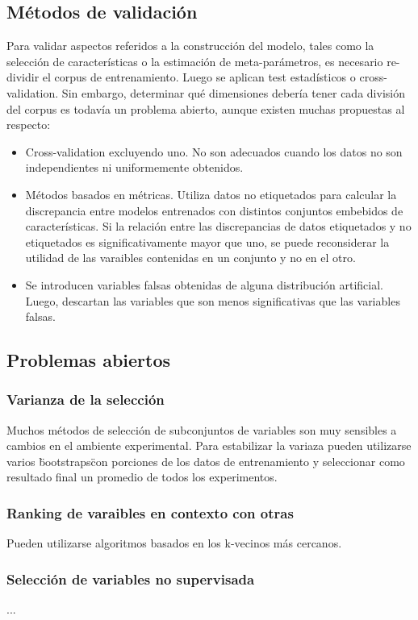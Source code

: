 \documentclass[11pt,spanish]{article}
\begin{document}
\subsection{Métodos de validación}
Para validar aspectos referidos a la construcción del modelo, tales como la selección de características o la estimación de meta-parámetros, es necesario re-dividir el corpus de entrenamiento. Luego se aplican test estadísticos o cross-validation. Sin embargo, determinar qué dimensiones debería tener cada división del corpus es todavía un problema abierto, aunque existen muchas propuestas al respecto:
\begin{itemize}
    \item Cross-validation excluyendo uno. No son adecuados cuando los datos no son independientes ni uniformemente obtenidos.
    \item Métodos basados en métricas. Utiliza datos no etiquetados para calcular la discrepancia entre modelos entrenados con distintos conjuntos embebidos de características. Si la relación entre las discrepancias de datos etiquetados y no etiquetados es significativamente mayor que uno, se puede reconsiderar la utilidad de las varaibles contenidas en un conjunto y no en el otro.
    \item Se introducen variables falsas obtenidas de alguna distribución artificial. Luego, descartan las variables que son menos significativas que las variables falsas.
\end{itemize}

\subsection{Problemas abiertos}
\subsubsection{Varianza de la selección}
Muchos métodos de selección de subconjuntos de variables son muy sensibles a cambios en el ambiente experimental. Para estabilizar la variaza pueden utilizarse varios \"bootstraps\" con porciones de los datos de entrenamiento y seleccionar como resultado final un promedio de todos los experimentos.
\subsubsection{Ranking de varaibles en contexto con otras}
Pueden utilizarse algoritmos basados en los k-vecinos más cercanos.
\subsubsection{Selección de variables no supervisada}
...
\end{document}
